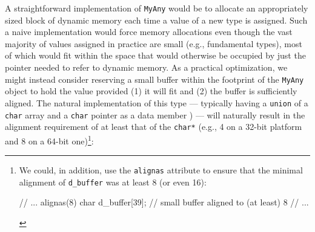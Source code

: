 \noindent A straightforward implementation of \lstinline!MyAny! would be to allocate
an appropriately sized block of dynamic memory each time a value of a
new type is assigned. Such a naive implementation would force memory
allocations even though the vast majority of values assigned in practice
are small (e.g., fundamental types), most of which would fit within the
space that would otherwise be occupied by just the pointer needed to
refer to dynamic memory. As a practical optimization, we might instead
consider reserving a small buffer  
  within the footprint of the
\lstinline!MyAny! object to hold the value provided (1) it will fit and (2)
the buffer is sufficiently aligned. The natural implementation of this
type --- typically having a \lstinline!union! of a \lstinline!char! array and a \lstinline!char! pointer as a data member ) --- will naturally result in the alignment requirement of at least that of the \lstinline!char*! (e.g., 4 on a 32-bit
platform and 8 on a 64-bit one){\cprotect\footnote{We could, in
  addition, use the \lstinline!alignas! attribute to ensure that
  the minimal alignment of \lstinline!d_buffer! was at least 8 (or even
  16):

  \begin{emcppslisting}[style=footcode]
  // ...
  alignas(8) char d_buffer[39];  // small buffer aligned to (at least) 8
  // ...
  \end{emcppslisting}
      }}:

